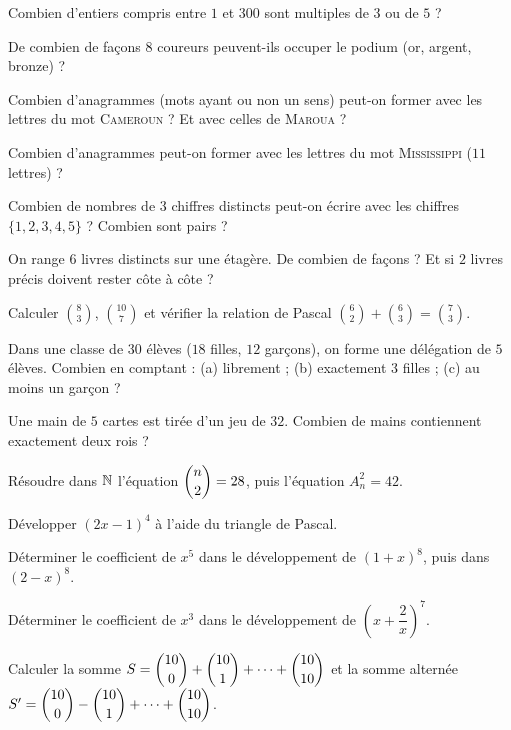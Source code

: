 \exo{} Combien d'entiers compris entre $1$ et $300$ sont multiples de $3$ ou de $5$ ?

\exo{} De combien de façons $8$ coureurs peuvent-ils occuper le podium (or, argent, bronze) ?

\exo{} Combien d'anagrammes (mots ayant ou non un sens) peut-on former avec les lettres du mot \textsc{Cameroun} ? Et avec celles de \textsc{Maroua} ?

\exo{} Combien d'anagrammes peut-on former avec les lettres du mot \textsc{Mississippi} ($11$ lettres) ?

\exo{} Combien de nombres de $3$ chiffres distincts peut-on écrire avec les chiffres $\{1,2,3,4,5\}$ ? Combien sont pairs ?

\exo{} On range $6$ livres distincts sur une étagère. De combien de façons ? Et si $2$ livres précis doivent rester côte à côte ?

\exo{} Calculer $\binom{8}{3}$, $\binom{10}{7}$ et vérifier la relation de Pascal $\binom{6}{2}+\binom{6}{3}=\binom{7}{3}$.

\exo{} Dans une classe de $30$ élèves ($18$ filles, $12$ garçons), on forme une délégation de $5$ élèves. Combien en comptant : (a) librement ; (b) exactement $3$ filles ; (c) au moins un garçon ?

\exo{} Une main de $5$ cartes est tirée d'un jeu de $32$. Combien de mains contiennent exactement deux rois ?

\exo{} Résoudre dans $\mathbb{N}$ l'équation $\dbinom n2=28$, puis l'équation $A_n^{2}=42$.

\exo{} Développer $(2x-1)^{4}$ à l'aide du triangle de Pascal.

\exo{} Déterminer le coefficient de $x^{5}$ dans le développement de $(1+x)^{8}$, puis dans $(2-x)^{8}$.

\exo{} Déterminer le coefficient de $x^{3}$ dans le développement de $\left(x+\dfrac{2}{x}\right)^{7}$.

\exo{} Calculer la somme $S=\dbinom{10}{0}+\dbinom{10}{1}+\cdots+\dbinom{10}{10}$ et la somme alternée $S'=\dbinom{10}{0}-\dbinom{10}{1}+\cdots+\dbinom{10}{10}$.

